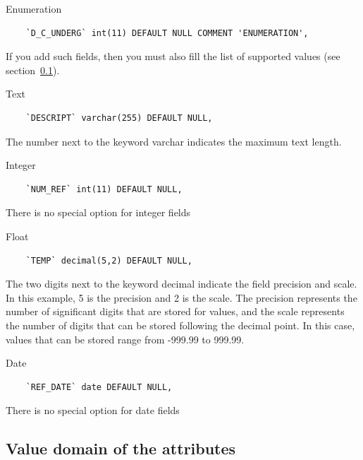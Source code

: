 \documentclass[a4paper, 12pt]{article}
\begin{document}
\begin{description*}
  \item [Enumeration] \hfill \\
    \begin{lstlisting}
    `D_C_UNDERG` int(11) DEFAULT NULL COMMENT 'ENUMERATION',
    \end{lstlisting}
    If you add such fields, then you must also fill the list of supported values (see section~\ref{sec:attribute-values}).
  \item [Text] \hfill \\
    \begin{lstlisting}
    `DESCRIPT` varchar(255) DEFAULT NULL,
    \end{lstlisting}
    The number next to the keyword varchar indicates the maximum text length. 
  \item [Integer] \hfill \\
    \begin{lstlisting}
    `NUM_REF` int(11) DEFAULT NULL,       
    \end{lstlisting}
    There is no special option for integer fields
  \item [Float]  \hfill \\

    \begin{lstlisting}
    `TEMP` decimal(5,2) DEFAULT NULL,
    \end{lstlisting}
    The two digits next to the keyword decimal indicate the field precision and scale. In this example, 5 is the precision and 2 is the scale. The precision represents the number of significant digits that are stored for values, and the scale represents the number of digits that can be stored following the decimal point. In this case, values that can be stored range from -999.99 to 999.99.
  \item [Date] \hfill \\

    \begin{lstlisting}
    `REF_DATE` date DEFAULT NULL,
    \end{lstlisting}
    There is no special option for date fields
\end{description*}


\subsection{Value domain of the attributes}
\label{sec:attribute-values}
\end{document}
